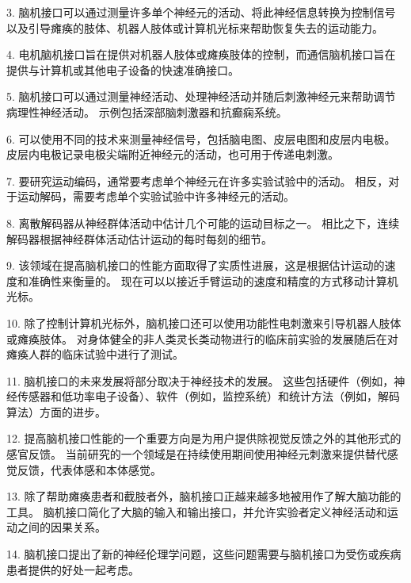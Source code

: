 3. 脑机接口可以通过测量许多单个神经元的活动、将此神经信息转换为控制信号以及引导瘫痪的肢体、机器人肢体或计算机光标来帮助恢复失去的运动能力。


4. 电机脑机接口旨在提供对机器人肢体或瘫痪肢体的控制，而通信脑机接口旨在提供与计算机或其他电子设备的快速准确接口。


5. 脑机接口可以通过测量神经活动、处理神经活动并随后刺激神经元来帮助调节病理性神经活动。
示例包括深部脑刺激器和抗癫痫系统。


6. 可以使用不同的技术来测量神经信号，包括脑电图、皮层电图和皮层内电极。
皮层内电极记录电极尖端附近神经元的活动，也可用于传递电刺激。


7. 要研究运动编码，通常要考虑单个神经元在许多实验试验中的活动。
相反，对于运动解码，需要考虑单个实验试验中许多神经元的活动。


8. 离散解码器从神经群体活动中估计几个可能的运动目标之一。
相比之下，连续解码器根据神经群体活动估计运动的每时每刻的细节。


9. 该领域在提高脑机接口的性能方面取得了实质性进展，这是根据估计运动的速度和准确性来衡量的。
现在可以以接近手臂运动的速度和精度的方式移动计算机光标。


10. 除了控制计算机光标外，脑机接口还可以使用功能性电刺激来引导机器人肢体或瘫痪肢体。
对身体健全的非人类灵长类动物进行的临床前实验的发展随后在对瘫痪人群的临床试验中进行了测试。


11. 脑机接口的未来发展将部分取决于神经技术的发展。
这些包括硬件（例如，神经传感器和低功率电子设备）、软件（例如，监控系统）和统计方法（例如，解码算法）方面的进步。


12. 提高脑机接口性能的一个重要方向是为用户提供除视觉反馈之外的其他形式的感官反馈。
当前研究的一个领域是在持续使用期间使用神经元刺激来提供替代感觉反馈，代表体感和本体感觉。


13. 除了帮助瘫痪患者和截肢者外，脑机接口正越来越多地被用作了解大脑功能的工具。
脑机接口简化了大脑的输入和输出接口，并允许实验者定义神经活动和运动之间的因果关系。


14. 脑机接口提出了新的神经伦理学问题，这些问题需要与脑机接口为受伤或疾病患者提供的好处一起考虑。

